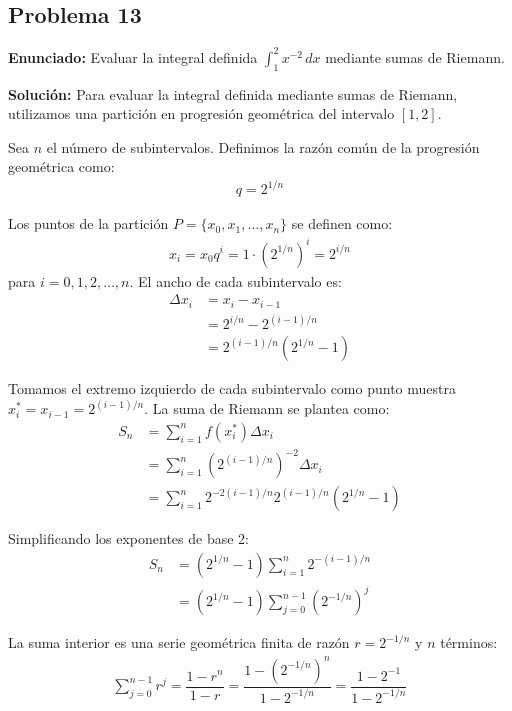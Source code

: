 \subsection*{Problema 13}
\textbf{Enunciado:} Evaluar la integral definida 
$\int_{1}^{2} x^{-2} \, dx$ mediante sumas de Riemann.

\textbf{Solución:}
Para evaluar la integral definida mediante sumas de Riemann, utilizamos una partición en progresión geométrica del intervalo $[1, 2]$. 

Sea $n$ el número de subintervalos. Definimos la razón común de la progresión geométrica como:
\begin{align*}
q = 2^{1/n}
\end{align*}

Los puntos de la partición $P = \{x_0, x_1, \dots, x_n\}$ se definen como:
\begin{align*}
x_i = x_0 q^i = 1 \cdot (2^{1/n})^i = 2^{i/n}
\end{align*}
para $i = 0, 1, 2, \dots, n$. El ancho de cada subintervalo es:
\begin{align*}
\Delta x_i &= x_i - x_{i-1} \\
&= 2^{i/n} - 2^{(i-1)/n} \\
&= 2^{(i-1)/n}(2^{1/n} - 1)
\end{align*}

Tomamos el extremo izquierdo de cada subintervalo como punto muestra $x_i^* = x_{i-1} = 2^{(i-1)/n}$. La suma de Riemann se plantea como:
\begin{align*}
S_n &= \sum_{i=1}^{n} f(x_i^*) \Delta x_i \\
&= \sum_{i=1}^{n} \left(2^{(i-1)/n}\right)^{-2} \Delta x_i \\
&= \sum_{i=1}^{n} 2^{-2(i-1)/n} 2^{(i-1)/n}(2^{1/n} - 1)
\end{align*}

Simplificando los exponentes de base 2:
\begin{align*}
S_n &= (2^{1/n} - 1) \sum_{i=1}^{n} 2^{-(i-1)/n} \\
&= (2^{1/n} - 1) \sum_{j=0}^{n-1} \left(2^{-1/n}\right)^j
\end{align*}

La suma interior es una serie geométrica finita de razón $r = 2^{-1/n}$ y $n$ términos:
\begin{align*}
\sum_{j=0}^{n-1} r^j = \dfrac{1 - r^n}{1 - r} = \dfrac{1 - (2^{-1/n})^n}{1 - 2^{-1/n}} = \dfrac{1 - 2^{-1}}{1 - 2^{-1/n}}
\end{align*}

